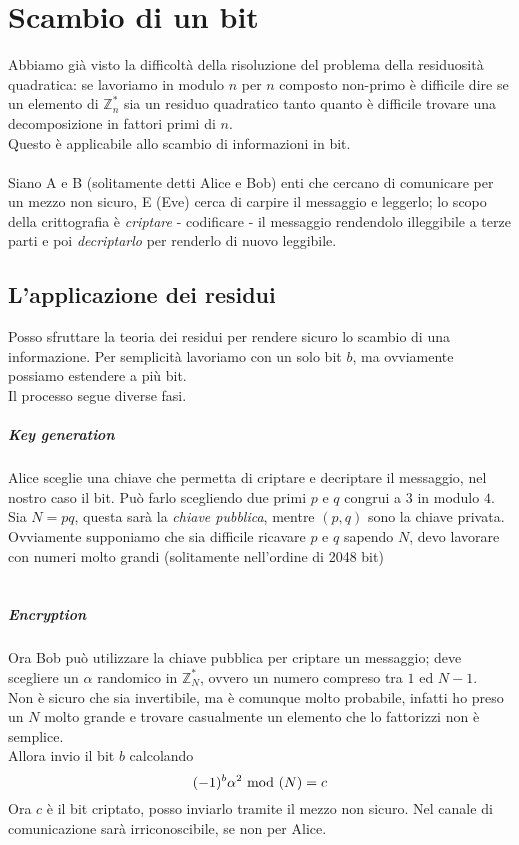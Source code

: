 	
	
	
	\chapter{Scambio di un bit}
	Abbiamo già visto la difficoltà della risoluzione del problema della residuosità quadratica: se lavoriamo in modulo $n$ per $n$ composto non-primo è difficile dire se un elemento di $\mathbb{Z}_n^*$ sia un residuo quadratico tanto quanto è difficile trovare una decomposizione in fattori primi di $n$. \\ Questo è applicabile allo scambio di informazioni in bit. \\ \\ Siano A e B (solitamente detti Alice e Bob) enti che cercano di comunicare per un mezzo non sicuro, E (Eve) cerca di carpire il messaggio e leggerlo; lo scopo della crittografia è \textit{criptare} - codificare - il messaggio rendendolo illeggibile a terze parti e poi \textit{decriptarlo} per renderlo di nuovo leggibile. 
	
	
	
	
	\section{L'applicazione dei residui}
	Posso sfruttare la teoria dei residui per rendere sicuro lo scambio di una informazione. Per semplicità lavoriamo con un solo bit $b$, ma ovviamente possiamo estendere a più bit. \\ Il processo segue diverse fasi.
	\paragraph{Key generation} Alice sceglie una chiave che permetta di criptare e decriptare il messaggio, nel nostro caso il bit. Può farlo scegliendo due primi $p$ e $q$ congrui a $3$ in modulo $4$. Sia $N=pq$, questa sarà la \textit{chiave pubblica}, mentre $(p,q)$ sono la chiave privata. \\ Ovviamente supponiamo che sia difficile ricavare $p$ e $q$ sapendo $N$, devo lavorare con numeri molto grandi (solitamente nell'ordine di 2048 bit) \\ \\
	\paragraph{Encryption} Ora Bob può utilizzare la chiave pubblica per criptare un messaggio; deve scegliere un $\alpha$ randomico in $\mathbb{Z}_N^*$, ovvero un numero compreso tra $1$ ed $N-1$. \\ Non è sicuro che sia invertibile, ma è comunque molto probabile, infatti ho preso un $N$ molto grande e trovare casualmente un elemento che lo fattorizzi non è semplice. \\ Allora invio il bit $b$ calcolando
	\begin{equation*}
	(-1)^b\alpha^2\ \mathrm{mod}\ (N)=c
	\end{equation*}
	Ora $c$ è il bit criptato, posso inviarlo tramite il mezzo non sicuro. Nel canale di comunicazione sarà irriconoscibile, se non per Alice.
